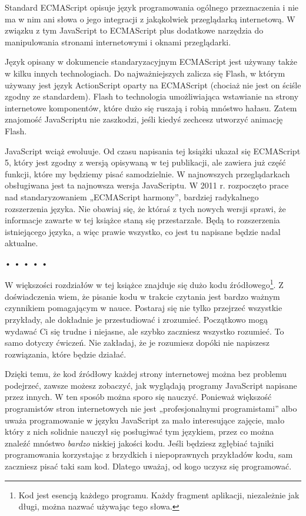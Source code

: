   
Standard ECMAScript opisuje język programowania ogólnego przeznaczenia i nie ma w nim ani słowa o jego integracji z jakąkolwiek przeglądarką internetową. W związku z tym JavaScript to ECMAScript plus dodatkowe narzędzia do manipulowania stronami internetowymi i oknami przeglądarki.

  
Język opisany w dokumencie standaryzacyjnym ECMAScript jest używany także w kilku innych technologiach. Do najważniejszych zalicza się Flash, w którym używany jest język ActionScript oparty na ECMAScript (chociaż nie jest on ściśle zgodny ze standardem). Flash to technologia umożliwiająca wstawianie na strony internetowe komponentów, które dużo się ruszają i robią mnóstwo hałasu. Zatem znajomość JavaScriptu nie zaszkodzi, jeśli kiedyś zechcesz utworzyć animację Flash.

  
JavaScript wciąż ewoluuje. Od czasu napisania tej książki ukazał się ECMAScript 5, który jest zgodny z wersją opisywaną w tej publikacji, ale zawiera już część funkcji, które my będziemy pisać samodzielnie. W najnowszych przeglądarkach obsługiwana jest ta najnowsza wersja JavaScriptu. W 2011 r. rozpoczęto prace nad standaryzowaniem „ECMAScript harmony”, bardziej radykalnego rozszerzenia języka. Nie obawiaj się, że któraś z tych nowych wersji sprawi, że informacje zawarte w tej książce staną się przestarzałe. Będą to rozszerzenia istniejącego języka, a więc prawie wszystko, co jest tu napisane będzie nadal aktualne.


\begin{center}
• • • • •
\end{center}

  
W większości rozdziałów w tej książce znajduje się dużo kodu źródłowego\footnote{Kod jest esencją każdego programu. Każdy fragment aplikacji, niezależnie jak długi, można nazwać używając tego słowa.}. Z doświadczenia wiem, że pisanie kodu w trakcie czytania jest bardzo ważnym czynnikiem pomagającym w nauce. Postaraj się nie tylko przejrzeć wszystkie przykłady, ale dokładnie je przestudiować i zrozumieć. Początkowo mogą wydawać Ci się trudne i niejasne, ale szybko zaczniesz wszystko rozumieć. To samo dotyczy ćwiczeń. Nie zakładaj, że je rozumiesz dopóki nie napiszesz rozwiązania, które będzie działać.

  
Dzięki temu, że kod źródłowy każdej strony internetowej można bez problemu podejrzeć, zawsze możesz zobaczyć, jak wyglądają programy JavaScript napisane przez innych. W ten sposób można sporo się nauczyć. Ponieważ większość programistów stron internetowych nie jest „profesjonalnymi programistami” albo uważa programowanie w języku JavaScript za mało interesujące zajęcie, mało który z nich solidnie nauczył się posługiwać tym językiem, przez co można znaleźć mnóstwo \emph{bardzo} niskiej jakości kodu. Jeśli będziesz zgłębiać tajniki programowania korzystając z brzydkich i niepoprawnych przykładów kodu, sam zaczniesz pisać taki sam kod. Dlatego uważaj, od kogo uczysz się programować.


